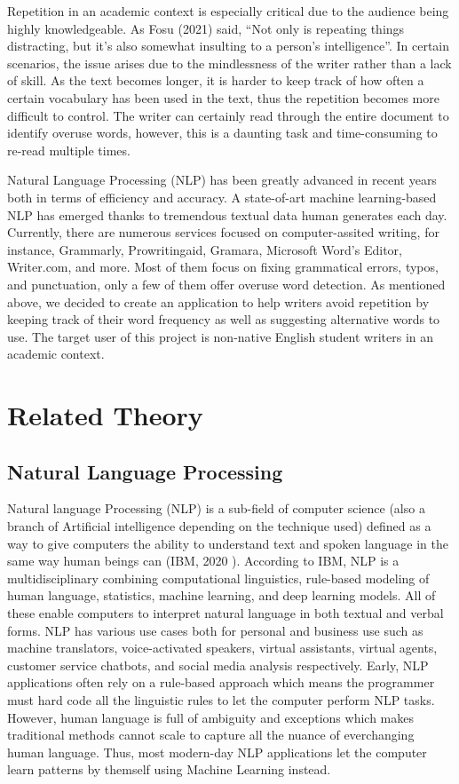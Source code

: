 \documentclass[12pt,oneside,openright,a4paper]{cpe-english-project}
\begin{document}
Repetition in an academic context is especially critical due to the audience being highly knowledgeable. As Fosu (2021)\cite{a} said, “Not only is repeating things distracting, but it’s also somewhat insulting to a person’s intelligence”. In certain scenarios, the issue arises due to the mindlessness of the writer rather than a lack of skill. As the text becomes longer, it is harder to keep track of how often a certain vocabulary has been used in the text, thus the repetition becomes more difficult to control. The writer can certainly read through the entire document to identify overuse words, however, this is a daunting task and time-consuming to re-read multiple times.

Natural Language Processing (NLP) has been greatly advanced in recent years both in terms of efficiency and accuracy. A state-of-art machine learning-based NLP has emerged thanks to tremendous textual data human generates each day. Currently, there are numerous services focused on computer-assited writing, for instance, Grammarly, Prowritingaid, Gramara, Microsoft Word’s Editor, Writer.com, and more. Most of them focus on fixing grammatical errors, typos, and punctuation, only a few of them offer overuse word detection. As mentioned above, we decided to create an application to help writers avoid repetition by keeping track of their word frequency as well as suggesting alternative words to use. The target user of this project is non-native English student writers in an academic context.
\section{Related Theory}
\subsection{Natural Language Processing}
Natural language Processing (NLP) is a sub-field of computer science (also a branch of Artificial intelligence depending on the technique used) defined as a way to give computers the ability to understand text and spoken language in the same way human beings can (IBM, 2020 \cite{c}). According to IBM,  NLP is a multidisciplinary combining computational linguistics, rule-based modeling of human language, statistics, machine learning, and deep learning models. All of these enable computers to interpret natural language in both textual and verbal forms.  NLP has various use cases both for personal and business use such as machine translators, voice-activated speakers, virtual assistants, virtual agents, customer service chatbots, and social media analysis respectively. Early, NLP applications often rely on a rule-based approach which means the programmer must hard code all the linguistic rules to let the computer perform NLP tasks. However, human language is full of ambiguity and exceptions which makes traditional methods cannot scale to capture all the nuance of everchanging human language. Thus, most modern-day NLP applications let the computer learn patterns by themself using Machine Learning instead.
\end{document}
